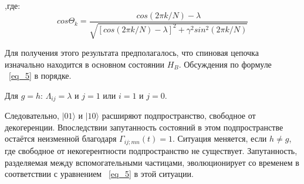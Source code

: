 \documentclass[11pt]{article}
\begin{document}
,где:
\begin{equation*}
cos \Theta_k = \frac{cos(2\pi k / N)-\lambda}
{\sqrt{[cos(2 \pi k / N) - \lambda]^2+\gamma^2 sin^2 (2\pi k / N)}}
\end{equation*}

Для получения этого результата предполагалось, что спиновая цепочка изначально находится в основном состоянии $H_B$. Обсуждения по формуле ~\ref{eq_5} в порядке.

Для $g=h$: $\Lambda_{ij}=\lambda$ и $j=1$ или $i=1$ и $j=0$.

Следовательно, $|01\rangle$ и $|10\rangle$ расширяют подпространство, свободное от декогеренции. Впоследствии запутанность состояний в этом подпространстве остаётся неизменной благодаря $\Gamma_{ij;mn}(t)=1$. Ситуация меняется, если $h \ne g$, где свободное от некогерентности подпространство не существует. Запутанность, разделяемая между вспомогательными частицами, эволюционирует со временем в соответствии с уравнением ~\ref{eq_5} в этой ситуации.
\end{document}
